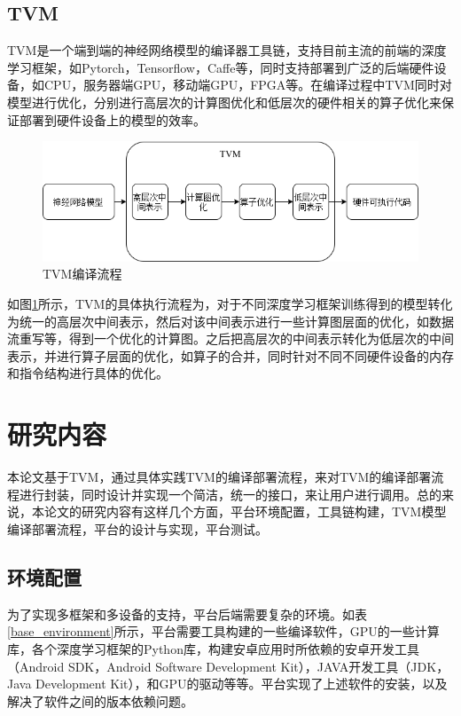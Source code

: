 \subsection{TVM}

TVM是一个端到端的神经网络模型的编译器工具链，支持目前主流的前端的深度学习框架，如Pytorch，Tensorflow，Caffe等，同时支持部署到广泛的后端硬件设备，如CPU，服务器端GPU，移动端GPU，FPGA等。在编译过程中TVM同时对模型进行优化，分别进行高层次的计算图优化和低层次的硬件相关的算子优化来保证部署到硬件设备上的模型的效率。

\begin{figure}[h!]
    \centering
    \includegraphics[width=270bp]{figure/tvm_overview.png}
    \caption{TVM编译流程}
    \label{tvm_overivew}
\end{figure}

如图\ref{tvm_overivew}所示，TVM的具体执行流程为，对于不同深度学习框架训练得到的模型转化为统一的高层次中间表示，然后对该中间表示进行一些计算图层面的优化，如数据流重写等，得到一个优化的计算图。之后把高层次的中间表示转化为低层次的中间表示，并进行算子层面的优化，如算子的合并，同时针对不同不同硬件设备的内存和指令结构进行具体的优化。

\section{研究内容}

本论文基于TVM，通过具体实践TVM的编译部署流程，来对TVM的编译部署流程进行封装，同时设计并实现一个简洁，统一的接口，来让用户进行调用。总的来说，本论文的研究内容有这样几个方面，平台环境配置，工具链构建，TVM模型编译部署流程，平台的设计与实现，平台测试。

\subsection{环境配置}

为了实现多框架和多设备的支持，平台后端需要复杂的环境。如表\ref{base_environment}所示，平台需要工具构建的一些编译软件，GPU的一些计算库，各个深度学习框架的Python库，构建安卓应用时所依赖的安卓开发工具（Android SDK，Android Software Development Kit），JAVA开发工具（JDK，Java Development Kit），和GPU的驱动等等。平台实现了上述软件的安装，以及解决了软件之间的版本依赖问题。

